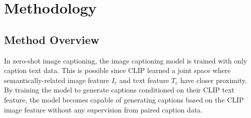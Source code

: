 
\section{Methodology}

\subsection{Method Overview}
\label{method:definition}
In zero-shot image captioning, the image captioning model is trained with only caption text data. This is possible since CLIP learned a joint space where semantically-related image feature $I_c$ and text feature $T_c$ have closer proximity. By training the model to generate captions conditioned on their CLIP text feature, the model becomes capable of generating captions based on the CLIP image feature without any supervision from paired caption data.

